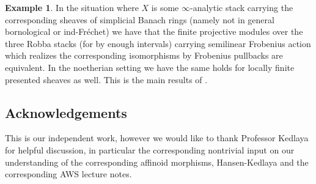 \documentclass[12pt]{amsart}
\theoremstyle{definition}
\numberwithin{equation}{section}
\newtheorem{example}[theorem]{Example}
\newtheorem{assumption}[theorem]{Assumption}
\begin{document}
\begin{example}
In the situation where $X$ is some $\infty$-analytic stack carrying the corresponding sheaves of simplicial Banach rings (namely not in general bornological or ind-Fr\'echet) we have that the finite projective modules over the three Robba stacks (for by enough intervals) carrying semilinear Frobenius action which realizes the corresponding isomorphisms by Frobenius pullbacks are equivalent. In the noetherian setting we have the same holds for locally finite presented sheaves as well. This is the main results of \cite[Theorem 4.6.1]{KL2}.
\end{example}





 















\newpage

\subsection*{Acknowledgements} 

This is our independent work, however we would like to thank Professor Kedlaya for helpful discussion, in particular the corresponding nontrivial input on our understanding of the corresponding affinoid morphisms, Hansen-Kedlaya and the corresponding AWS lecture notes.



\newpage
\end{document}
